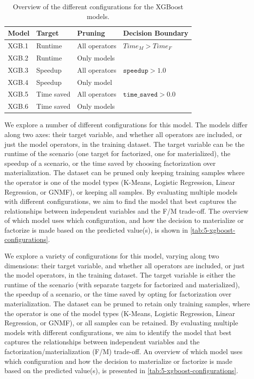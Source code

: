 \begin{table}[ht]
    \centering
    \begin{tabular}{llll}
        \toprule
        Model & Target     & Pruning       & Decision Boundary            \\
        \midrule \midrule
        XGB.1 & Runtime    & All operators & $Time_M > Time_F$            \\
        XGB.2 & Runtime    & Only models   &                              \\
        XGB.3 & Speedup    & All operators & $\texttt{speedup} > 1.0$     \\
        XGB.4 & Speedup    & Only model    &                              \\
        XGB.5 & Time saved & All operators & $\texttt{time\_saved} > 0.0$ \\
        XGB.6 & Time saved & Only models   &                              \\
        \bottomrule
    \end{tabular}
    \caption[XGBoost configurations]{Overview of the different configurations for the XGBoost models.}
    \label{tab:5-xgboost-configurations}
\end{table}

We explore a number of different configurations for this model. The models differ along two axes: their target variable, and whether all operators are included, or just the model operators, in the training dataset. The target variable can be the runtime of the scenario (one target for factorized, one for materialized), the speedup of a scenario, or the time saved by choosing factorization over materialization. The dataset can be pruned only keeping training samples where the operator is one of the model types (K-Means, Logistic Regression, Linear Regression, or GNMF), or keeping all samples. By evaluating multiple models with different configurations, we aim to find the model that best captures the relationships between independent variables and the F/M trade-off. The overview of which model uses which configuration, and how the decision to materialize or factorize is made based on the predicted value(s), is shown in \autoref{tab:5-xgboost-configurations}.

We explore a variety of configurations for this model, varying along two dimensions: their target variable, and whether all operators are included, or just the model operators, in the training dataset. The target variable is either the runtime of the scenario (with separate targets for factorized and materialized), the speedup of a scenario, or the time saved by opting for factorization over materialization. The dataset can be pruned to retain only training samples, where the operator is one of the model types (K-Means, Logistic Regression, Linear Regression, or GNMF), or all samples can be retained. By evaluating multiple models with different configurations, we aim to identify the model that best captures the relationships between independent variables and the factorization/materialization (F/M) trade-off. An overview of which model uses which configuration and how the decision to materialize or factorize is made based on the predicted value(s), is presented in \autoref{tab:5-xgboost-configurations}.

